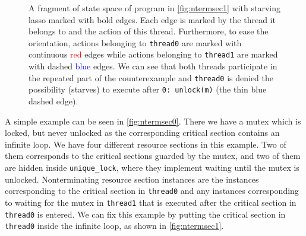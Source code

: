 \begin{figure}[tp]
\center
{}
\caption{
A fragment of state space of program in \autoref{fig:ntermsec1} with starving lasso marked with bold edges.
Each edge is marked by the thread it belongs to and the action of this thread.
Furthermore, to ease the orientation, actions belonging to \texttt{thread0} are marked with continuous \textcolor{red}{red} edges while actions belonging to \texttt{thread1} are marked with dashed \textcolor{blue}{blue} edges.
We can see that both threads participate in the repeated part of the counterexample and \texttt{thread0} is denied the possibility (starves) to execute after \texttt{0:~unlock(m)} (the thin blue dashed edge).
} \label{fig:ntermsec1ce}
\end{figure}

A simple example can be seen in \autoref{fig:ntermsec0}. There we have a mutex which
is locked, but never unlocked as the corresponding critical section contains an
infinite loop. We have four different resource sections in this example. Two
of them corresponds to the critical sections guarded by the mutex, and two of
them are hidden inside  \texttt{unique\_lock}, where they implement
waiting until the mutex is unlocked.
 Nonterminating resource section instances are the instances corresponding to the critical
section in \texttt{thread0} and any instances corresponding to waiting for the mutex
in \texttt{thread1} that is executed after the critical section in
\texttt{thread0} is entered.  We can fix this example by putting the critical
section in \texttt{thread0} inside the infinite loop, as shown in \autoref{fig:ntermsec1}.


